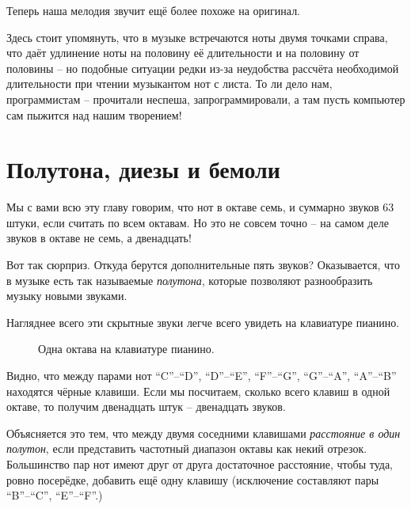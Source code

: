 \documentclass[a4paper,twoside]{book}
\newcommand{\note}[1]{
  \vspace{8pt}
  \begin{tabularx}{\textwidth}{m{1cm} m{9cm}}
    
    & \textbf{Примечание:} #1 \\
  \end{tabularx}
}
\begin{document}
Теперь наша мелодия звучит ещё более похоже на оригинал.

Здесь стоит упомянуть, что в музыке встречаются ноты двумя точками справа, что
даёт удлинение ноты на половину её длительности и на половину от половины -- но
подобные ситуации редки из-за неудобства рассчёта необходимой длительности при
чтении музыкантом нот с листа. То ли дело нам, программистам -- прочитали
неспеша, запрограммировали, а там пусть компьютер сам пыжится над нашим
творением!

\section{Полутона, диезы и бемоли}

Мы с вами всю эту главу говорим, что нот в октаве семь, и суммарно звуков 63
штуки, если считать по всем октавам. Но это не совсем точно -- на самом деле
звуков в октаве не семь, а двенадцать!

Вот так сюрприз. Откуда берутся дополнительные пять звуков? Оказывается, что в
музыке есть так называемые \emph{полутона}, которые позволяют разнообразить
музыку новыми звуками.

Нагляднее всего эти скрытные звуки легче всего увидеть на клавиатуре пианино.

\begin{figure}[ht]
  \caption{Одна октава на клавиатуре пианино.}
  \centering
  \label{fig:lilypond-music-graph-1}
\end{figure}

Видно, что между парами нот ``C''--``D'', ``D''--``E'', ``F''--``G'',
``G''--``A'', ``A''--``B'' находятся чёрные клавиши. Если мы посчитаем, сколько
всего клавиш в одной октаве, то получим двенадцать штук -- двенадцать звуков.

Объясняется это тем, что между двумя соседними клавишами \emph{расстояние в один
полутон}, если представить частотный диапазон октавы как некий отрезок.
Большинство пар нот имеют друг от друга достаточное расстояние, чтобы туда,
ровно посерёдке, добавить ещё одну клавишу (исключение составляют пары
``B''--``C'', ``E''--``F''.)
\end{document}
